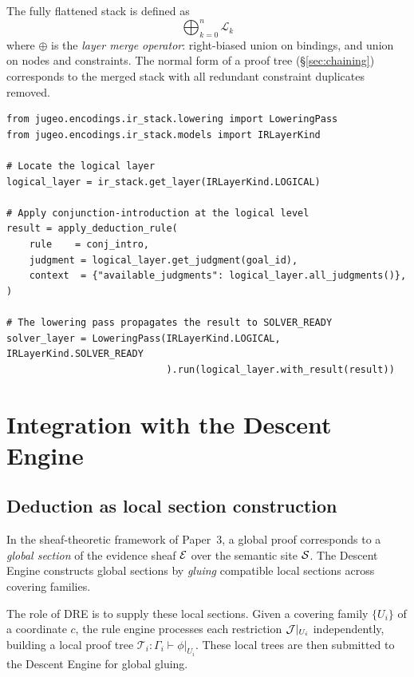 \documentclass[11pt]{article}
\newcommand{\PTree}{\mathcal{T}}              %
\newcommand{\Prov}[2]{#1 \vdash #2}           %
\begin{document}
The fully flattened stack is defined as
\[
  \bigoplus_{k=0}^{n} \mathcal{L}_k
\]
where $\oplus$ is the \emph{layer merge operator}: right-biased union on
bindings, and union on nodes and constraints.  The normal form of a
proof tree (§\ref{sec:chaining}) corresponds to the merged stack with
all redundant constraint duplicates removed.

\begin{lstlisting}[style=jugeo-python,
  caption={Applying a deduction rule at the Logical IR layer.}]
from jugeo.encodings.ir_stack.lowering import LoweringPass
from jugeo.encodings.ir_stack.models import IRLayerKind

# Locate the logical layer
logical_layer = ir_stack.get_layer(IRLayerKind.LOGICAL)

# Apply conjunction-introduction at the logical level
result = apply_deduction_rule(
    rule    = conj_intro,
    judgment = logical_layer.get_judgment(goal_id),
    context  = {"available_judgments": logical_layer.all_judgments()},
)

# The lowering pass propagates the result to SOLVER_READY
solver_layer = LoweringPass(IRLayerKind.LOGICAL, IRLayerKind.SOLVER_READY
                            ).run(logical_layer.with_result(result))
\end{lstlisting}

\section{Integration with the Descent Engine}\label{sec:descent}

\subsection{Deduction as local section construction}

In the sheaf-theoretic framework of Paper~3, a global proof corresponds
to a \emph{global section} of the evidence sheaf $\mathcal{E}$ over the
semantic site $\mathcal{S}$.  The Descent Engine constructs global sections by
\emph{gluing} compatible local sections across covering families.

The role of \textsc{DRE} is to supply these local sections.  Given a
covering family $\{U_i\}$ of a coordinate $c$, the rule engine
processes each restriction $\mathcal{J}|_{U_i}$ independently, building a local
proof tree $\PTree_i : \Prov{\Gamma_i}{\phi|_{U_i}}$.  These local
trees are then submitted to the Descent Engine for global gluing.
\end{document}

